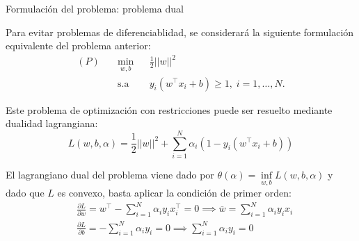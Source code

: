 \documentclass[9pt]{beamer}
\begin{document}
\begin{frame}{Formulación del problema: problema dual}

Para evitar problemas de diferenciablidad, se considerará la siguiente formulación equivalente del problema anterior:
\begin{equation*}
\begin{aligned}
(P)\quad & \underset{w,b}{\min}
& & \frac{1}{2}||w||^2\\
& \text{s.a}
& & y_i (w^\top x_i +b) \geq 1, \; i = 1, \ldots, N.
\end{aligned}
\end{equation*}\pause

Este problema de optimización con restricciones puede ser resuelto mediante dualidad lagrangiana:
\begin{equation*}
    L(w,b,\alpha) = \frac{1}{2}||w||^2 + \sum\limits_{i=1}^{N} \alpha_i \left(1-y_i (w^\top x_i +b)\right)
\end{equation*}\pause
	
El lagrangiano dual del problema viene dado por $\theta(\alpha) = \inf\limits_{w,b} L(w,b,\alpha)$ y dado que $L$ es convexo, basta aplicar la condición de primer orden:
\begin{align*}
	&\frac{\partial L}{\partial w} = w^\top - \sum_{i=1}^N \alpha_i y_i x_i^\top = 0 \implies \overline{w} = \sum_{i=1}^N \alpha_i y_i x_i\\
	&\frac{\partial L}{\partial b} = -\sum_{i=1}^N \alpha_i y_i = 0 \implies \sum_{i=1}^N \alpha_i y_i = 0
\end{align*}

	
\end{frame}
\end{document}
